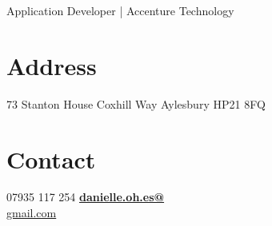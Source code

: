 \documentclass[]{friggeri-cv}
\begin{document}
      {\-\hspace{1.5cm} Application Developer | Accenture Technology}
      

\begin{aside}
    \section{Address}
        73 Stanton House
        Coxhill Way
        Aylesbury
        HP21 8FQ
    ~
    \section{Contact}
        07935 117 254
        \href{mailto:danielle.osullivan@accenture.com}{\textbf{danielle.oh.es@}\\gmail.com}
    ~

\end{aside}
\end{document}
